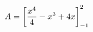 \documentclass[preview]{standalone}
\begin{document}
\begin{align*}
\special{dvisvgm:raw <g id='unique000'>}A=\left[\frac{x^4}{4}-x^3+4x\right]_{-1}^{2}\special{dvisvgm:raw </g>}
\end{align*}
\end{document}
